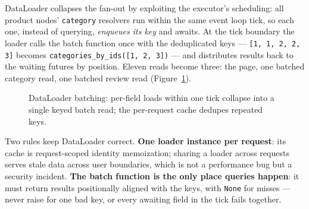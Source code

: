 DataLoader collapses the fan-out by exploiting the executor's scheduling:
all product nodes' \texttt{category} resolvers run within the same event
loop tick, so each one, instead of querying, \emph{enqueues its key} and
awaits. At the tick boundary the loader calls the batch function once with
the deduplicated keys --- \texttt{[1, 1, 2, 2, 3]} becomes
\texttt{categories\_by\_ids([1, 2, 3])} --- and distributes results back
to the waiting futures by position. Eleven reads become three: the page,
one batched category read, one batched review read
(Figure~\ref{fig:ch12-dataloader}).

\begin{figure}[h]
  \centering
  \caption{DataLoader batching: per-field loads within one tick collapse
           into a single keyed batch read; the per-request cache dedupes
           repeated keys.}
  \label{fig:ch12-dataloader}
\end{figure}

Two rules keep DataLoader correct. \textbf{One loader instance per
request}: its cache is request-scoped identity memoization; sharing a
loader across requests serves stale data across user boundaries, which is
not a performance bug but a security incident. \textbf{The batch function
is the only place queries happen}: it must return results positionally
aligned with the keys, with \texttt{None} for misses --- never raise for
one bad key, or every awaiting field in the tick fails together.

